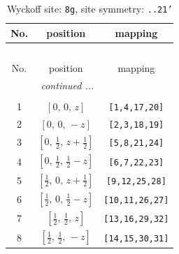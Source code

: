 \documentclass[fleqn,8pt]{jsarticle}
\begin{document}
\begin{longtable}{ccc}
\caption{Wyckoff site: {\tt 8g}, site symmetry: {\tt ..21'}}
 \\
 \hline \hline
No. & position & mapping \\ \hline \endfirsthead

\multicolumn{2}{l}{\tablename\ \thetable{}} \\
 \hline \hline
No. & position & mapping \\ \hline \endhead

 \hline \hline
\multicolumn{2}{r}{\footnotesize\it continued ...} \\ \endfoot

 \hline \hline
\multicolumn{2}{r}{} \\ \endlastfoot

1 & $\left[ 0,\, 0,\, z \right]$ & {\tt [1,4,17,20]} \\ \hline
2 & $\left[ 0,\, 0,\, - z \right]$ & {\tt [2,3,18,19]} \\ \hline
3 & $\left[ 0,\, \frac{1}{2},\, z + \frac{1}{2} \right]$ & {\tt [5,8,21,24]} \\ \hline
4 & $\left[ 0,\, \frac{1}{2},\, \frac{1}{2} - z \right]$ & {\tt [6,7,22,23]} \\ \hline
5 & $\left[ \frac{1}{2},\, 0,\, z + \frac{1}{2} \right]$ & {\tt [9,12,25,28]} \\ \hline
6 & $\left[ \frac{1}{2},\, 0,\, \frac{1}{2} - z \right]$ & {\tt [10,11,26,27]} \\ \hline
7 & $\left[ \frac{1}{2},\, \frac{1}{2},\, z \right]$ & {\tt [13,16,29,32]} \\ \hline
8 & $\left[ \frac{1}{2},\, \frac{1}{2},\, - z \right]$ & {\tt [14,15,30,31]} \\
\end{longtable}
\renewcommand{\arraystretch}{1.2}
\end{document}
